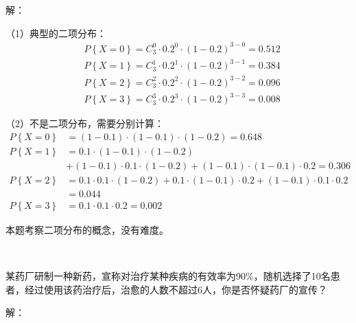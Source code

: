 解：

（1）典型的二项分布：
\begin{align*}
&P\left\{ X=0 \right\} =C_{3}^{0}\cdot 0.2^0\cdot \left( 1-0.2 \right) ^{3-0}=0.512 \\
&P\left\{ X=1 \right\} =C_{3}^{1}\cdot 0.2^1\cdot \left( 1-0.2 \right) ^{3-1}=0.384 \\
&P\left\{ X=2 \right\} =C_{3}^{2}\cdot 0.2^2\cdot \left( 1-0.2 \right) ^{3-2}=0.096 \\
&P\left\{ X=3 \right\} =C_{3}^{3}\cdot 0.2^3\cdot \left( 1-0.2 \right) ^{3-3}=0.008
\end{align*}

（2）不是二项分布，需要分别计算：
\begin{align*}
P\left\{ X=0 \right\} &=\left( 1-0.1 \right) \cdot \left( 1-0.1 \right) \cdot \left( 1-0.2 \right) =0.648 \\
P\left\{ X=1 \right\} &=0.1\cdot \left( 1-0.1 \right) \cdot \left( 1-0.2 \right) \\
&+\left( 1-0.1 \right) \cdot 0.1\cdot \left( 1-0.2 \right) +\left( 1-0.1 \right) \cdot \left( 1-0.1 \right) \cdot 0.2=0.306 \\
P\left\{ X=2 \right\} &=0.1\cdot 0.1\cdot \left( 1-0.2 \right) +0.1\cdot \left( 1-0.1 \right) \cdot 0.2+\left( 1-0.1 \right) \cdot 0.1\cdot 0.2 \\
&=0.044 \\
P\left\{ X=3 \right\} &=0.1\cdot 0.1\cdot 0.2=0.002
\end{align*}

\begin{tcolorbox}
本题考察二项分布的概念，没有难度。
\end{tcolorbox}

~

\begin{example}
某药厂研制一种新药，宣称对治疗某种疾病的有效率为90\%，随机选择了10名患者，经过使用该药治疗后，治愈的人数不超过6人，你是否怀疑药厂的宣传？
\end{example}

解：

